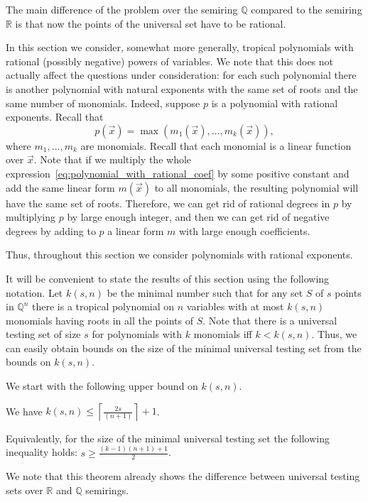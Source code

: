 \documentclass[11pt]{article}
\newcommand{\bb}[1]{\mathbb{#1}}
\begin{document}
The main difference of the problem over the semiring $\bb{Q}$ compared to the semiring $\bb{R}$ is that now the points of the universal set have to be rational. 

In this section we consider, somewhat more generally, tropical polynomials with rational (possibly negative) powers of variables. We note that this does not actually affect the questions under consideration: for each such polynomial there is another polynomial with natural exponents with the same set of roots and the same number of monomials. Indeed, suppose $p$ is a polynomial with rational exponents. Recall that 
\begin{equation} \label{eq:polynomial_with_rational_coef}
p(\vec{x}) = \max(m_1(\vec{x}),\ldots, m_{k}(\vec{x})),
\end{equation}
where $m_1, \ldots, m_k$ are monomials. Recall that each monomial is a linear function over $\vec{x}$. Note that if we multiply the whole expression~\eqref{eq:polynomial_with_rational_coef} by some positive constant and add the same linear form $m(\vec{x})$ to all monomials, the resulting polynomial will have the same set of roots. Therefore, we can get rid of rational degrees in $p$ by multiplying $p$ by large enough integer, and then we can get rid of negative degrees by adding to $p$ a linear form $m$ with large enough coefficients.

Thus, throughout this section we consider polynomials with rational exponents.

It will be convenient to state the results of this section using the following notation. Let $k(s,n)$ be the minimal number such that for any set $S$ of $s$ points in $\bb{Q}^n$ there is a tropical polynomial on $n$ variables with at most $k(s,n)$ monomials having roots in all the points of $S$.  Note that there is a universal testing set of size $s$ for polynomials with $k$ monomials iff $k<k(s,n)$. Thus, we can easily obtain bounds on the size of the minimal universal testing set from the bounds on $k(s,n)$.


We start with the following upper bound on $k(s,n)$.
\begin{theorem} \label{thm:upper bound on k}
We have $k(s,n) \leq \left\lceil \frac{2s}{(n+1)}\right\rceil + 1$.

Equivalently, for the size of the minimal universal testing set the following inequality holds: $s\geq \frac{(k-1)(n+1)+1}{2}$.
\end{theorem}

We note that this theorem already shows the difference between universal testing sets over $\bb{R}$ and $\bb{Q}$ semirings.
\end{document}
